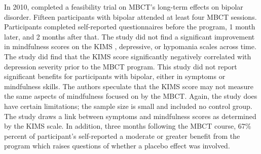 In 2010, \cite{weber_mindfulness-based_2010} completed a feasibility trial on MBCT’s long-term effects on bipolar disorder. Fifteen participants with bipolar attended at least four MBCT sessions. Participants completed self-reported questionnaires before the program, 1 month later, and 2 months after that. The study did not find a significant improvement in mindfulness scores on the KIMS \cite{baer_assessment_2004}, depressive, or hypomania scales across time. The study did find that the KIMS score significantly negatively correlated with depression severity prior to the MBCT program. This study did not report significant benefits for participants with bipolar, either in symptoms or mindfulness skills. The authors speculate that the KIMS score may not measure the same aspects of mindfulness focused on by the MBCT. Again, the study does have certain limitations; the sample size is small and included no control group. The study draws a link between symptoms and mindfulness scores as determined by the KIMS scale. In addition, three months following the MBCT course, 67\% percent of participant’s self-reported a moderate or greater benefit from the program which raises questions of whether a placebo effect was involved.